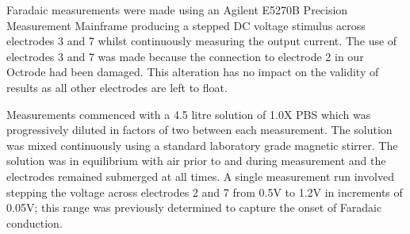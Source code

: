 \documentclass[journal, a4paper]{IEEEtran}
\begin{document}
{Faradaic measurements were made using an Agilent E5270B Precision Measurement Mainframe producing a stepped DC voltage stimulus across electrodes 3 and 7 whilst continuously measuring the output current. 
{
    \color{blue}
    The use of electrodes 3 and 7 was made because the connection to electrode 2 in our Octrode had been damaged. This alteration has no impact on the validity of results as all other electrodes are left to float.
}

Measurements commenced with a 4.5 litre solution of 1.0X PBS which was progressively diluted in factors of two between each measurement. The solution was mixed continuously using a standard laboratory grade magnetic stirrer. The solution was in equilibrium with air prior to and during measurement and the electrodes remained submerged at all times.
A single measurement run involved stepping the voltage across electrodes 2 and 7 from 0.5\thinspace V to 1.2\thinspace V in increments of 0.05\thinspace V; this range was previously determined to capture the onset of Faradaic conduction.

}
\end{document}

